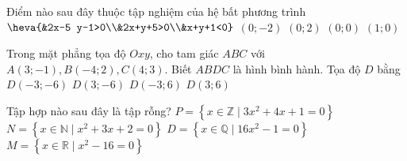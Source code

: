 \begin{ex}%
	Điểm nào sau đây thuộc tập nghiệm của hệ bất phương trình $\heva{&2x-5 y-1>0\\&2x+y+5>0\\&x+y+1<0}$
	\choice
	{\True $(0;-2)$}
	{$(0; 2)$}
	{$(0; 0)$}
	{$(1; 0)$}
\end{ex}
\begin{ex}%
	Trong mặt phẳng tọa độ $Oxy$, cho tam giác $ABC$ với $A(3;-1), B(-4; 2), C(4; 3)$. Biết $ABDC$ là hình bình hành. Tọa độ $D$ bằng
	\choice
	{$D(-3;-6)$}
	{$D(3;-6)$}
	{\True $D(-3; 6)$}
	{$D(3; 6)$}
\end{ex}
\begin{ex}%
	Tập hợp nào sau đây là tập rỗng?
	\choice
	{$P=\left\{x \in \mathbb{Z} \mid 3 x^2+4 x+1=0\right\}$}
	{\True $N=\left\{x \in \mathbb{N} \mid x^2+3x+2=0\right\}$}
	{$D=\left\{x \in \mathbb{Q} \mid 16 x^2-1=0\right\}$}
	{$M=\left\{x \in \mathbb{R} \mid x^2-16=0\right\}$}
\end{ex}

